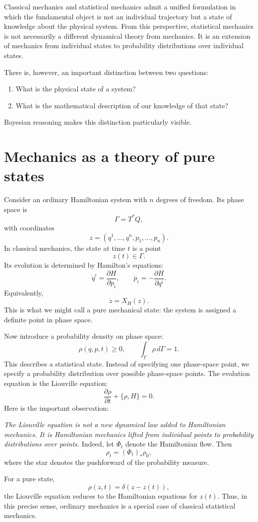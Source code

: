  Classical mechanics and statistical mechanics admit a unified formulation in
 which the fundamental object is not an individual trajectory but a state of
 knowledge about the physical system. From this perspective, statistical
 mechanics is not necessarily a different dynamical theory from mechanics. It
 is an extension of mechanics from individual states to probability
 distributions over individual states.

There is, however, an important distinction between two questions:
\begin{enumerate}
   \item What is the physical state of a system?
   \item What is the mathematical description of our knowledge of that state?
\end{enumerate}
Bayesian reasoning makes this distinction particularly visible.

\section{ Mechanics as a theory of pure states}
Consider an ordinary Hamiltonian system with \(n\) degrees of freedom.
Its phase space is
\[\Gamma=T^*Q,\]
with coordinates
\[z=(q^1,\ldots,q^n,p_1,\ldots,p_n).\]
In classical mechanics, the state at time \(t\) is a point
\[z(t)\in\Gamma.\]
Its evolution is determined by Hamilton's equations:
\[
\dot q^i=\frac{\partial H}{\partial p_i},
\qquad
\dot p_i=-\frac{\partial H}{\partial q^i}.
\]
Equivalently,
\[\dot z=X_H(z).\]
This is what we might call a pure mechanical state: the system is assigned a
definite point in phase space.

Now introduce a probability density on phase space:
\[\rho(q,p,t)\geq 0, \qquad \int_\Gamma \rho\,d\Gamma=1.\]
This describes a statistical state. Instead of specifying one phase-space
point, we specify a probability distribution over possible phase-space points.
The evolution equation is the Liouville equation:
\[\boxed{\frac{\partial\rho}{\partial t}+\{\rho,H\}=0.}\]
Here is the important observation:

\emph{The Liouville equation is not a new dynamical law added to Hamiltonian
mechanics. It is Hamiltonian mechanics lifted from individual points to
probability distributions over points.}
Indeed, let \(\Phi_t\) denote the Hamiltonian flow. Then
\[\rho_t=(\Phi_t)_*\rho_0,\]
where the star denotes the pushforward of the probability measure.

For a pure state,
\[\rho(z,t)=\delta(z-z(t)),\]
the Liouville equation reduces to the Hamiltonian equations for \(z(t)\).
Thus, in this precise sense, ordinary mechanics is a special case of classical
statistical mechanics.

